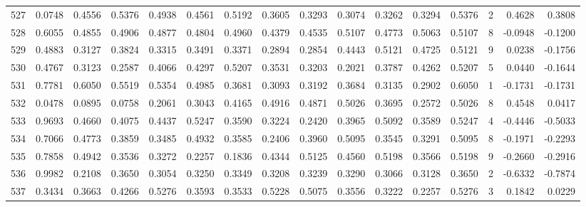 \begin{tabular}{lrrrrrrrrrrrrrrr}
527 &      0.0748 &  0.4556 &  0.5376 &  0.4938 &  0.4561 &  0.5192 &  0.3605 &  0.3293 &  0.3074 &  0.3262 &   0.3294 &     0.5376 &      2 &                    0.4628 &                     0.3808 \\
528 &      0.6055 &  0.4855 &  0.4906 &  0.4877 &  0.4804 &  0.4960 &  0.4379 &  0.4535 &  0.5107 &  0.4773 &   0.5063 &     0.5107 &      8 &                   -0.0948 &                    -0.1200 \\
529 &      0.4883 &  0.3127 &  0.3824 &  0.3315 &  0.3491 &  0.3371 &  0.2894 &  0.2854 &  0.4443 &  0.5121 &   0.4725 &     0.5121 &      9 &                    0.0238 &                    -0.1756 \\
530 &      0.4767 &  0.3123 &  0.2587 &  0.4066 &  0.4297 &  0.5207 &  0.3531 &  0.3203 &  0.2021 &  0.3787 &   0.4262 &     0.5207 &      5 &                    0.0440 &                    -0.1644 \\
531 &      0.7781 &  0.6050 &  0.5519 &  0.5354 &  0.4985 &  0.3681 &  0.3093 &  0.3192 &  0.3684 &  0.3135 &   0.2902 &     0.6050 &      1 &                   -0.1731 &                    -0.1731 \\
532 &      0.0478 &  0.0895 &  0.0758 &  0.2061 &  0.3043 &  0.4165 &  0.4916 &  0.4871 &  0.5026 &  0.3695 &   0.2572 &     0.5026 &      8 &                    0.4548 &                     0.0417 \\
533 &      0.9693 &  0.4660 &  0.4075 &  0.4437 &  0.5247 &  0.3590 &  0.3224 &  0.2420 &  0.3965 &  0.5092 &   0.3589 &     0.5247 &      4 &                   -0.4446 &                    -0.5033 \\
534 &      0.7066 &  0.4773 &  0.3859 &  0.3485 &  0.4932 &  0.3585 &  0.2406 &  0.3960 &  0.5095 &  0.3545 &   0.3291 &     0.5095 &      8 &                   -0.1971 &                    -0.2293 \\
535 &      0.7858 &  0.4942 &  0.3536 &  0.3272 &  0.2257 &  0.1836 &  0.4344 &  0.5125 &  0.4560 &  0.5198 &   0.3566 &     0.5198 &      9 &                   -0.2660 &                    -0.2916 \\
536 &      0.9982 &  0.2108 &  0.3650 &  0.3054 &  0.3250 &  0.3349 &  0.3208 &  0.3239 &  0.3290 &  0.3066 &   0.3128 &     0.3650 &      2 &                   -0.6332 &                    -0.7874 \\
537 &      0.3434 &  0.3663 &  0.4266 &  0.5276 &  0.3593 &  0.3533 &  0.5228 &  0.5075 &  0.3556 &  0.3222 &   0.2257 &     0.5276 &      3 &                    0.1842 &                     0.0229 \\

\end{tabular}
